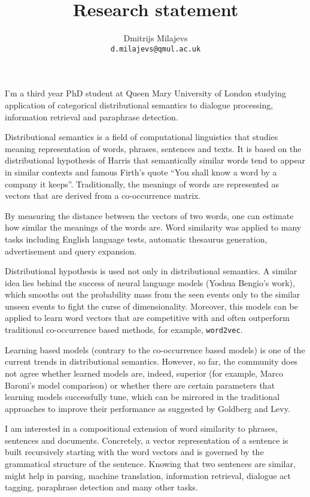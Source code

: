 \documentclass[10pt]{article}
\title{Research statement}
\author{
Dmitrijs Milajevs \\
{\tt d.milajevs@qmul.ac.uk} \\
}
\date{}
\begin{document}
\maketitle

\thispagestyle{empty}


I'm a third year PhD student at Queen Mary University of London studying
application of categorical distributional semantics to dialogue processing,
information retrieval and paraphrase detection.

Distributional semantics is a field of computational linguistics that studies
meaning representation of words, phrases, sentences and texts. It is based on
the distributional hypothesis of Harris that semantically similar words tend to
appear in similar contexts and famous Firth's quote ``You shall know a word by a
company it keeps''. Traditionally, the meanings of words are represented as
vectors that are derived from a co-occurrence matrix.

By measuring the distance between the vectors of two words, one can estimate how
similar the meanings of the words are. Word similarity was applied to many tasks
including English language tests, automatic thesaurus generation, advertisement
and query expansion.

Distributional hypothesis is used not only in distributional semantics. A
similar idea lies behind the success of neural language models (Yoshua Bengio's
work), which smooths out the probability mass from the seen events only to the
similar unseen events to fight the curse of dimensionality. Moreover, this
models can be applied to learn word vectors that are competitive with and often
outperform traditional co-occurrence based methods, for example,
\texttt{word2vec}.

Learning based models (contrary to the co-occurrence based models) is one of the
current trends in distributional semantics. However, so far, the community does
not agree whether learned models are, indeed, superior (for example, Marco
Baroni's model comparison) or whether there are certain parameters that learning
models successfully tune, which can be mirrored in the traditional approaches to
improve their performance as suggested by Goldberg and Levy.

I am interested in a compositional extension of word similarity to phrases,
sentences and documents. Concretely, a vector representation of a sentence is
built recursively starting with the word vectors and is governed by the
grammatical structure of the sentence. Knowing that two sentences are similar,
might help in parsing, machine translation, information retrieval, dialogue act
tagging, paraphrase detection and many other tasks.
\end{document}
